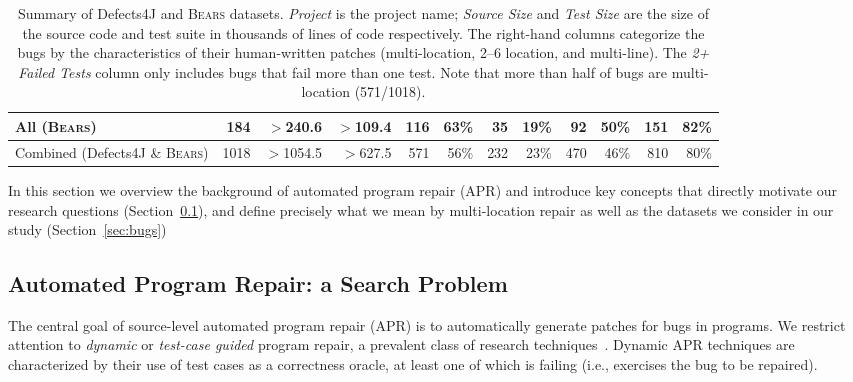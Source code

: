 \documentclass[10pt,journal,compsoc]{IEEEtran}
\newcommand\bears{\textsc{Bears}\xspace}
\begin{document}
\begin{table}
\begin{center}
\begin{tabular}{l  rrr | rr rr rr rr }
\midrule
All (\bears) & 184 & $>$240.6 & $>$109.4 & 116 & 63\% & 35 & 19\% & 92 & 50\% & 151 & 82\% \\
\midrule
Combined (Defects4J \& \bears) & 1018 & $>$1054.5 & $>$627.5 & 571 & 56\% & 232 & 23\% & 470 & 46\% & 810 & 80\%\\
\bottomrule
\end{tabular}
\end{center}
\caption{\label{tab:dataset-characteristics} \small Summary of Defects4J and \bears
  datasets. \emph{Project} is the project name; \emph{Source Size} and
  \emph{Test Size} are the size of the source code and test suite in thousands
  of lines of code respectively. The right-hand columns categorize the bugs by
  the characteristics of their human-written patches (multi-location, 2--6
  location, and multi-line). The \emph{2+ Failed Tests} column only includes
  bugs that fail more than one test. Note that more than half of bugs are
  multi-location (571/1018).  }
\end{table}

In this section we overview the background of automated program repair (APR) and
introduce key concepts that directly motivate our research questions
(Section~\ref{sec:apr}), and define precisely what we mean by multi-location
repair as well as the datasets we consider in our study (Section~\ref{sec:bugs})

\subsection{Automated Program Repair: a Search Problem}
\label{sec:apr}

The central goal of source-level automated program repair (APR) is to
automatically generate patches for bugs in programs. We restrict attention to
\emph{dynamic} or \emph{test-case guided} program repair, a prevalent class of
research techniques~\cite{cacm19}.  Dynamic APR techniques
are characterized by their use of test cases as a correctness oracle,
at least one of which is failing (i.e., exercises the bug
to be repaired).
\end{document}
